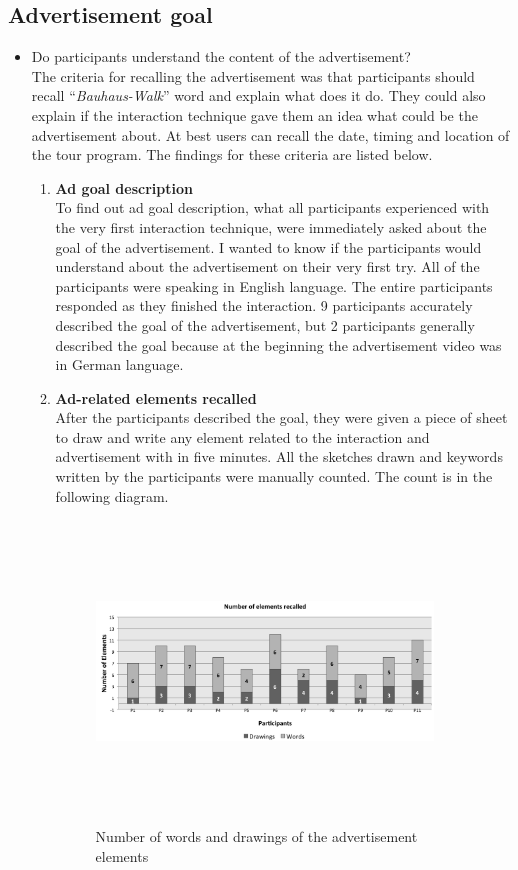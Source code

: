 \subsection{Advertisement goal}


\begin{itemize}


\item Do participants understand the content of the advertisement?\\
The criteria for recalling the advertisement was that participants should recall ``\emph{Bauhaus-Walk}'' word and explain what does it do. They could also explain if the interaction technique gave them an idea what could be the advertisement about. At best users can recall the date, timing and location of the tour program. The findings for these criteria are listed below.

\begin{enumerate}

\item   \textbf{Ad goal description} \\
To find out ad goal description, what all participants experienced with the very first interaction technique, were immediately asked about the goal of the advertisement. I wanted to know if the participants would understand about the advertisement on their very first try. All of the participants were speaking in English language.  The entire participants responded as they finished the interaction. 9 participants accurately described the goal of the advertisement, but 2 participants generally described the goal because at the beginning the advertisement video was in German language.

\item   \textbf{Ad-related elements recalled}  \\ 
After the participants described the goal, they were given a piece of sheet to draw and write any element related to the interaction and advertisement with in five minutes. All the sketches drawn and keywords written by the participants were manually counted. The count is in the following diagram. 


\begin{figure}[H]
\centering
\includegraphics[width=0.9\textwidth,height=8cm]{Figures/6/word_recall}%
 \caption{Number of words and drawings of the advertisement elements }%
 \label{fig:word_recall}%
\end{figure}


\end{enumerate}
\end{itemize}
